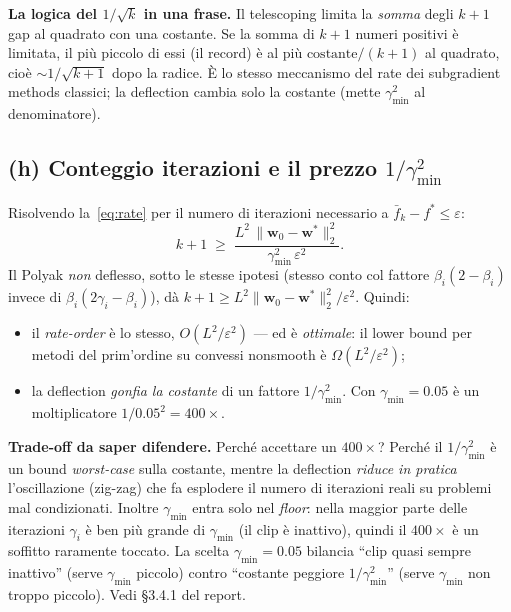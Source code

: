 \documentclass[11pt,a4paper]{article}
\theoremstyle{definition}
\newcommand{\w}{\bm{w}}
\newcommand{\wstar}{\w^{*}}
\newcommand{\fstar}{f^{*}}
\newcommand{\fbar}{\bar{f}}
\newcommand{\gmin}{\gamma_{\min}}
\newcommand{\eps}{\varepsilon}
\newcommand{\norm}[1]{\lVert #1\rVert}
\begin{document}
\begin{keybox}
\textbf{La logica del $1/\sqrt{k}$ in una frase.} Il telescoping limita la \emph{somma} degli
$k+1$ gap al quadrato con una costante. Se la somma di $k+1$ numeri positivi è limitata, il più
piccolo di essi (il record) è al più $\text{costante}/(k+1)$ al quadrato, cioè
$\sim1/\sqrt{k+1}$ dopo la radice. È lo stesso meccanismo del rate dei subgradient methods
classici; la deflection cambia solo la costante (mette $\gmin^2$ al denominatore).
\end{keybox}

\subsection{(h) Conteggio iterazioni e il prezzo $1/\gmin^2$}
\label{sub:count}

Risolvendo la~\eqref{eq:rate} per il numero di iterazioni necessario a
$\fbar_k-\fstar\le\eps$:
\[
k+1 \;\ge\; \frac{L^2\,\norm{\w_0-\wstar}_2^2}{\gmin^2\,\eps^2}.
\]
Il Polyak \emph{non} deflesso, sotto le stesse ipotesi (stesso conto col fattore
$\beta_i(2-\beta_i)$ invece di $\beta_i(2\gamma_i-\beta_i)$), dà
$k+1\ge L^2\norm{\w_0-\wstar}_2^2/\eps^2$. Quindi:
\begin{itemize}[leftmargin=1.4em]
\item il \emph{rate-order} è lo stesso, $O(L^2/\eps^2)$ --- ed è \emph{ottimale}: il lower
bound per metodi del prim'ordine su convessi nonsmooth è $\Omega(L^2/\eps^2)$;
\item la deflection \emph{gonfia la costante} di un fattore $1/\gmin^2$. Con $\gmin=0.05$ è un
moltiplicatore $1/0.05^2=400\times$.
\end{itemize}

\begin{oralbox}
\textbf{Trade-off da saper difendere.} Perché accettare un $400\times$? Perché il
$1/\gmin^2$ è un bound \emph{worst-case} sulla costante, mentre la deflection \emph{riduce in
pratica} l'oscillazione (zig-zag) che fa esplodere il numero di iterazioni reali su problemi
mal condizionati. Inoltre $\gmin$ entra solo nel \emph{floor}: nella maggior parte delle
iterazioni $\gamma_i$ è ben più grande di $\gmin$ (il clip è inattivo), quindi il $400\times$
è un soffitto raramente toccato. La scelta $\gmin=0.05$ bilancia ``clip quasi sempre inattivo''
(serve $\gmin$ piccolo) contro ``costante peggiore $1/\gmin^2$'' (serve $\gmin$ non troppo
piccolo). Vedi §3.4.1 del report.
\end{oralbox}
\end{document}
